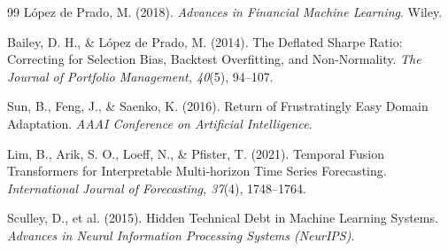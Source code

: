 \begin{thebibliography}{99}
López de Prado, M. (2018). \textit{Advances in Financial Machine Learning}. Wiley.

Bailey, D. H., \& López de Prado, M. (2014). The Deflated Sharpe Ratio: Correcting for
Selection Bias, Backtest Overfitting, and Non-Normality. \textit{The Journal of
Portfolio Management, 40}(5), 94--107.

Sun, B., Feng, J., \& Saenko, K. (2016). Return of Frustratingly Easy Domain Adaptation.
\textit{AAAI Conference on Artificial Intelligence}.

Lim, B., Arik, S. O., Loeff, N., \& Pfister, T. (2021). Temporal Fusion Transformers for
Interpretable Multi-horizon Time Series Forecasting. \textit{International Journal of
Forecasting, 37}(4), 1748--1764.

Sculley, D., et al. (2015). Hidden Technical Debt in Machine Learning Systems.
\textit{Advances in Neural Information Processing Systems (NeurIPS)}.

\end{thebibliography}
